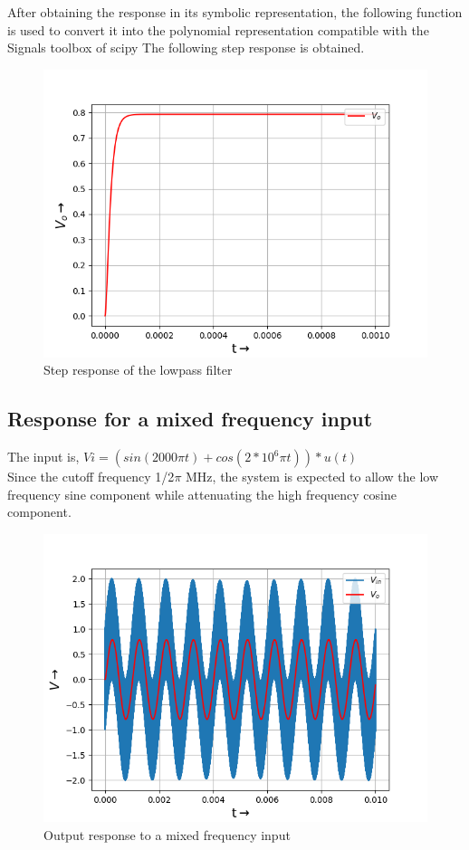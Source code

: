 \documentclass[11pt, a4paper]{article}
\begin{document}
After obtaining the response in its symbolic representation, the following
function is used to convert it into the polynomial representation compatible
with the Signals toolbox of scipy
The following step response is obtained.
\begin{figure}[!tbh]
   	\centering
   	\includegraphics[scale=0.5]{fig0.png}  %
   	\caption{Step response of the lowpass filter}
   	\label{fig:sample}
   \end{figure}
 
\subsection{Response for a mixed frequency input}
The input is,
$Vi = (sin(2000 \pi t) + cos(2*10^6 \pi t))*u(t)
$
\\
Since the cutoff frequency 1/2$\pi$ MHz, the system is expected to allow the low frequency sine component while attenuating the high frequency cosine component.
\begin{figure}[!tbh]
   	\centering
   	\includegraphics[scale=0.5]{fig1.png}  %
   	\caption{Output response to a mixed frequency input}
   	\label{fig:sample}
   \end{figure}
\end{document}
